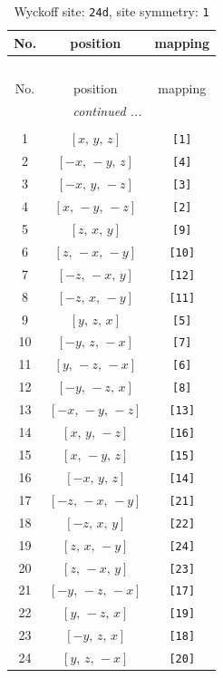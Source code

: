 \documentclass[fleqn,8pt]{jsarticle}
\begin{document}
\begin{longtable}{ccc}
\caption{Wyckoff site: {\tt 24d}, site symmetry: {\tt 1}}
 \\
 \hline \hline
No. & position & mapping \\ \hline \endfirsthead

\multicolumn{2}{l}{\tablename\ \thetable{}} \\
 \hline \hline
No. & position & mapping \\ \hline \endhead

 \hline \hline
\multicolumn{2}{r}{\footnotesize\it continued ...} \\ \endfoot

 \hline \hline
\multicolumn{2}{r}{} \\ \endlastfoot

1 & $\left[ x,\, y,\, z \right]$ & {\tt [1]} \\ \hline
2 & $\left[ - x,\, - y,\, z \right]$ & {\tt [4]} \\ \hline
3 & $\left[ - x,\, y,\, - z \right]$ & {\tt [3]} \\ \hline
4 & $\left[ x,\, - y,\, - z \right]$ & {\tt [2]} \\ \hline
5 & $\left[ z,\, x,\, y \right]$ & {\tt [9]} \\ \hline
6 & $\left[ z,\, - x,\, - y \right]$ & {\tt [10]} \\ \hline
7 & $\left[ - z,\, - x,\, y \right]$ & {\tt [12]} \\ \hline
8 & $\left[ - z,\, x,\, - y \right]$ & {\tt [11]} \\ \hline
9 & $\left[ y,\, z,\, x \right]$ & {\tt [5]} \\ \hline
10 & $\left[ - y,\, z,\, - x \right]$ & {\tt [7]} \\ \hline
11 & $\left[ y,\, - z,\, - x \right]$ & {\tt [6]} \\ \hline
12 & $\left[ - y,\, - z,\, x \right]$ & {\tt [8]} \\ \hline
13 & $\left[ - x,\, - y,\, - z \right]$ & {\tt [13]} \\ \hline
14 & $\left[ x,\, y,\, - z \right]$ & {\tt [16]} \\ \hline
15 & $\left[ x,\, - y,\, z \right]$ & {\tt [15]} \\ \hline
16 & $\left[ - x,\, y,\, z \right]$ & {\tt [14]} \\ \hline
17 & $\left[ - z,\, - x,\, - y \right]$ & {\tt [21]} \\ \hline
18 & $\left[ - z,\, x,\, y \right]$ & {\tt [22]} \\ \hline
19 & $\left[ z,\, x,\, - y \right]$ & {\tt [24]} \\ \hline
20 & $\left[ z,\, - x,\, y \right]$ & {\tt [23]} \\ \hline
21 & $\left[ - y,\, - z,\, - x \right]$ & {\tt [17]} \\ \hline
22 & $\left[ y,\, - z,\, x \right]$ & {\tt [19]} \\ \hline
23 & $\left[ - y,\, z,\, x \right]$ & {\tt [18]} \\ \hline
24 & $\left[ y,\, z,\, - x \right]$ & {\tt [20]} \\
\end{longtable}
\end{document}

